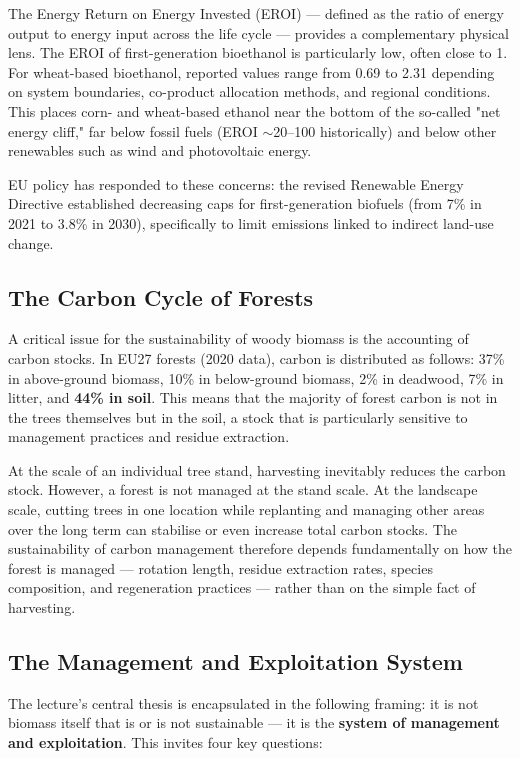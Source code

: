 The Energy Return on Energy Invested (EROI) — defined as the ratio of energy output to energy input across the life cycle — provides a complementary physical lens. The EROI of first-generation bioethanol is particularly low, often close to 1. For wheat-based bioethanol, reported values range from 0.69 to 2.31 depending on system boundaries, co-product allocation methods, and regional conditions. This places corn- and wheat-based ethanol near the bottom of the so-called "net energy cliff," far below fossil fuels (EROI $\sim$20–100 historically) and below other renewables such as wind and photovoltaic energy.

EU policy has responded to these concerns: the revised Renewable Energy Directive established decreasing caps for first-generation biofuels (from 7\% in 2021 to 3.8\% in 2030), specifically to limit emissions linked to indirect land-use change.

\subsection{The Carbon Cycle of Forests}

A critical issue for the sustainability of woody biomass is the accounting of carbon stocks. In EU27 forests (2020 data), carbon is distributed as follows: 37\% in above-ground biomass, 10\% in below-ground biomass, 2\% in deadwood, 7\% in litter, and \textbf{44\% in soil}. This means that the majority of forest carbon is not in the trees themselves but in the soil, a stock that is particularly sensitive to management practices and residue extraction.

At the scale of an individual tree stand, harvesting inevitably reduces the carbon stock. However, a forest is not managed at the stand scale. At the landscape scale, cutting trees in one location while replanting and managing other areas over the long term can stabilise or even increase total carbon stocks. The sustainability of carbon management therefore depends fundamentally on how the forest is managed — rotation length, residue extraction rates, species composition, and regeneration practices — rather than on the simple fact of harvesting.

\subsection{The Management and Exploitation System}

The lecture's central thesis is encapsulated in the following framing: it is not biomass itself that is or is not sustainable — it is the \textbf{system of management and exploitation}. This invites four key questions:


